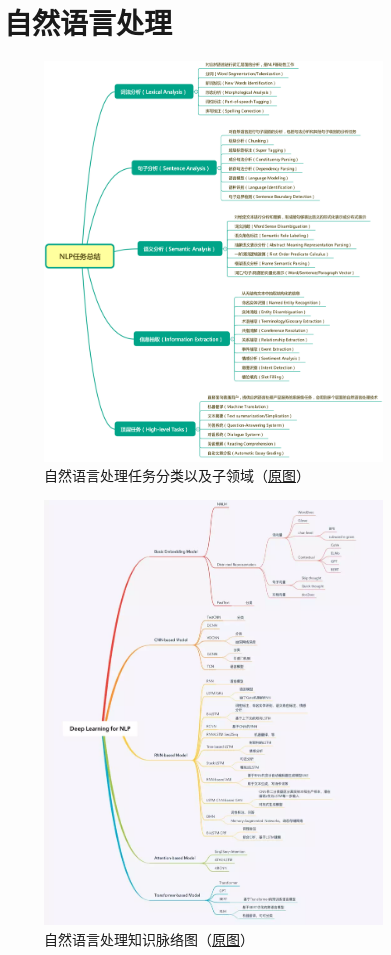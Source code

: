\documentclass[lang=cn,11pt,a4paper]{elegant_template}
\begin{document}
\section{自然语言处理}
\begin{figure}[htbp]
  \centering
  \vspace{0cm}
  \includegraphics[width=0.8\textwidth]{image/nlp_1.png}
  \caption{自然语言处理任务分类以及子领域（\href{https://www.jianshu.com/p/d80b065bdcf0}{原图}）}
\end{figure}

\begin{figure}[htbp]
  \centering
  \vspace{-2cm}
  \includegraphics[width=0.8\textwidth]{image/nlp_2.png}
  \caption{自然语言处理知识脉络图（\href{https://www.jiqizhixin.com/articles/2019-06-21}{原图}）}
\end{figure}
\end{document}
